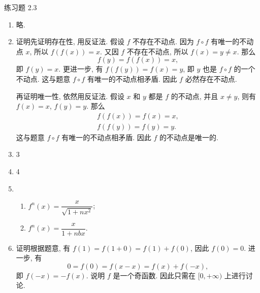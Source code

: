 



% 


\begin{center}
    {\heiti 练习题 2.3}
\end{center}

\begin{enumerate}
    \item %
        略.
    \item %
        {\heiti 证明}\quad 先证明存在性, 用反证法. 假设 $f$ 不存在不动点. 因为 $f \circ f$ 有唯一的不动点 $x$,
        所以 $f(f(x)) = x$. 又因 $f$ 不存在不动点, 所以 $f(x) = y \ne x$. 那么
        \[
            f(y) = f(f(x)) = x,   
        \]
        即 $f(y) = x$. 更进一步, 有 $f(f(y)) = f(x) = y$, 即 $y$ 也是 $f \circ f$ 的一个不动点. 这与题意 $f \circ f$ 有唯一的不动点相矛盾.
        因此 $f$ 必然存在不动点.
        
        再证明唯一性, 依然用反证法. 假设 $x$ 和 $y$ 都是 $f$ 的不动点, 并且 $x \neq y$, 则有 $f(x) = x$, $f(y) = y$.
        那么
        \begin{gather*}
            f(f(x)) = f(x) = x, \\
            f(f(y)) = f(y) = y.
        \end{gather*}
        这与题意 $f \circ f$ 有唯一的不动点相矛盾. 因此 $f$ 的不动点是唯一的.
    \item 3
    \item 4
    \item %
        \begin{enumerate}[(1)]
            \item %
                $f^n(x) = \dfrac{x}{\sqrt{1 + nx^2}}$;
            \item %
                $f^n(x) = \dfrac{x}{1 + nbx}$.
        \end{enumerate}
    \item %
        {\heiti 证明}\quad 根据题意, 有 $f(1) = f(1 + 0) = f(1) + f(0)$, 因此 $f(0) = 0$. 进一步, 有
        \[
            0 = f(0) = f(x - x) = f(x) + f(-x),    
        \]
        即 $f(-x) = -f(x)$. 说明 $f$ 是一个奇函数. 因此只需在 $[0, +\infty)$ 上进行讨论.
        

\end{enumerate}
